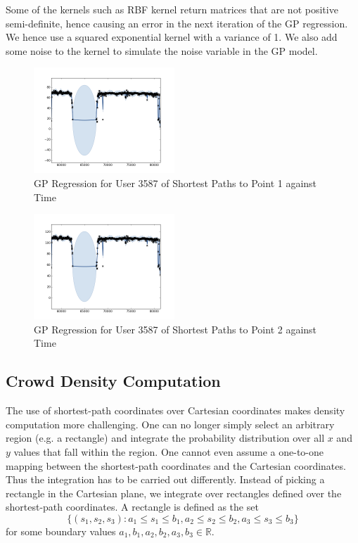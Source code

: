 \documentclass[letterpaper]{article}
\begin{document}
Some of the kernels such as RBF kernel return matrices that are not positive semi-definite, hence causing an error in the next iteration of the GP regression. We hence use a squared exponential kernel with a variance of 1. We also add some noise to the kernel to simulate the noise variable in the GP model.

\begin{figure}[!h]
  \centering
    \includegraphics[width=200px]{diagrams/3587-path1.png}
  \caption{GP Regression for User 3587 of Shortest Paths to Point 1 against Time}
  \label{fig:path1}
\end{figure}

\begin{figure}[!h]
  \centering
    \includegraphics[width=200px]{diagrams/3587-path2.png}
  \caption{GP Regression for User 3587 of Shortest Paths to Point 2 against Time}
  \label{fig:path2}
\end{figure}

\subsection{Crowd Density Computation}

The use of shortest-path coordinates over Cartesian coordinates makes density computation more challenging. One can no longer simply select an arbitrary region (e.g. a rectangle) and integrate the probability distribution over all $x$ and $y$ values that fall within the region. One cannot even assume a one-to-one mapping between the shortest-path coordinates and the Cartesian coordinates. \\

Thus the integration has to be carried out differently. Instead of picking a rectangle in the Cartesian plane, we integrate over rectangles defined over the shortest-path coordinates. A rectangle is defined as the set 
\[\{(s_1,s_2,s_3) : a_1\leq s_1\leq b_1, a_2\leq s_2\leq b_2, a_3\leq s_3\leq b_3\}\]
for some boundary values $a_1,b_1,a_2,b_2,a_3,b_3 \in \mathbb{R}$.\\
\end{document}
